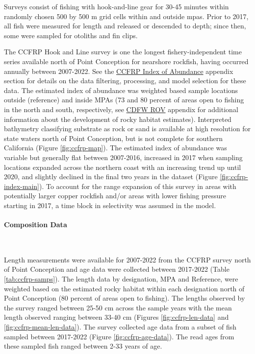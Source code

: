 \documentclass[11pt,
  english,
  letterpaper,
]{article}
\begin{document}
Surveys consist of fishing with hook-and-line gear for 30-45 minutes within randomly chosen 500 by 500 m grid cells within and outside \glspl{mpa}. Prior to 2017, all fish were measured for length and released or descended to depth; since then, some were sampled for otoliths and fin clips.

The CCFRP Hook and Line survey is one the longest fishery-independent time series available north of Point Conception for nearshore rockfish, having occurred annually between 2007-2022. See the \protect\hyperlink{ccfrp-index}{CCFRP Index of Abundance} appendix section for details on the data filtering, processing, and model selection for these data. The estimated index of abundance was weighted based sample locations outside (reference) and inside MPAs (73 and 80 percent of areas open to fishing in the north and south, respectively, see \href{cdfw-rov-index}{CDFW ROV} appendix for additional information about the development of rocky habitat estimates). Interpreted bathymetry classifying substrate as rock or sand is available at high resolution for state waters north of Point Conception, but is not complete for southern California (Figure \ref{fig:ccfrp-map}). The estimated index of abundance was variable but generally flat between 2007-2016, increased in 2017 when sampling locations expanded across the northern coast with an increasing trend up until 2020, and slightly declined in the final two years in the dataset (Figure \ref{fig:ccfrp-index-main}). To account for the range expansion of this survey in areas with potentially larger copper rockfish and/or areas with lower fishing pressure starting in 2017, a time block in selectivity was assumed in the model.

\hypertarget{composition-data-2}{%
\paragraph{Composition Data}\label{composition-data-2}}

~

Length measurements were available for 2007-2022 from the CCFRP survey north of Point Conception and age data were collected between 2017-2022 (Table \ref{tab:ccfrp-samps}). The length data by designation, MPA and Reference, were weighted based on the estimated rocky habitat within each designation north of Point Conception (80 percent of areas open to fishing). The lengths observed by the survey ranged between 25-50 cm across the sample years with the mean length observed ranging between 33-40 cm (Figures \ref{fig:ccfrp-len-data} and \ref{fig:ccfrp-mean-len-data}). The survey collected age data from a subset of fish sampled between 2017-2022 (Figure \ref{fig:ccfrp-age-data}). The read ages from these sampled fish ranged between 2-33 years of age.
\end{document}
